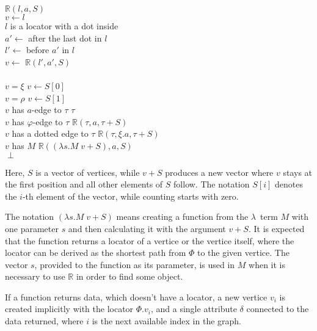 \begin{twocols}
\begin{algo}
 $\mathbb{R}(l,a,S)$ \\
  \tab $v \gets l$ \\
  \tab {} $l$ is a locator with a dot inside \\
  \tab\tab $a' \gets$ after the last dot in $l$ \\
  \tab\tab $l' \gets$ before $a'$ in $l$ \\
  \tab\tab $v \gets$ $\mathbb{R}(l', a', S)$ \\
  \tab {} \\
  \tab {} $v = \xi$  $v \gets S[0]$ \\
  \tab {} $v = \rho$  $v \gets S[1]$ \\
  \tab {} $v$ has $a$-edge to $\tau$   $\tau$ \\
  \tab {} $v$ has $\varphi$-edge to $\tau$   $\mathbb{R}(\tau, a, \tau + S)$ \\
  \tab {} $v$ has a dotted edge to $\tau$   $\mathbb{R}(\tau, \xi.a, \tau + S)$ \\
  \tab {} $v$ has $M$   $\mathbb{R}((\lambda s.M \; v + S), a, S)$ \\
  \tab {} $\perp$ \\
\end{algo}
\end{twocols}

Here, $S$ is a vector of vertices, while $v+S$ produces a new vector
where $v$ stays at the first position and all other elements of $S$ follow.
The notation $S[i]$ denotes the $i$-th element of the vector, while
counting starts with zero.

The notation $(\lambda s.M \; v + S)$ means creating a function from
the $\lambda$~term $M$ with one parameter $s$ and then calculating
it with the argument $v + S$.
It is expected that the function returns a locator of a vertice or
the vertice itself, where the locator can be derived as
the shortest path from $\Phi$ to the given vertice.
The vector $s$, provided to the
function as its parameter, is used in $M$ when it is necessary
to use $\mathbb{R}$ in order to find some object.

If a function returns data, which doesn't have a locator, a new vertice
$v_i$ is created implicitly with the locator $\Phi.v_i$, and
a single attribute $\delta$ connected to the data returned, where
$i$ is the next available index in the graph.

